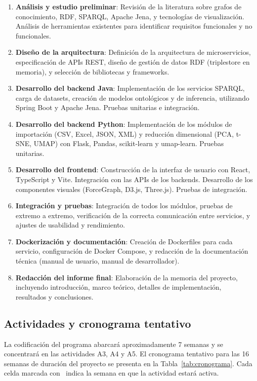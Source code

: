 \documentclass{article}
\begin{document}
\begin{enumerate}[leftmargin=*]
    \item \textbf{Análisis y estudio preliminar}: Revisión de la literatura sobre grafos de conocimiento, RDF, SPARQL, Apache Jena, y tecnologías de visualización. Análisis de herramientas existentes para identificar requisitos funcionales y no funcionales.
    \item \textbf{Diseño de la arquitectura}: Definición de la arquitectura de microservicios, especificación de APIs REST, diseño de gestión de datos RDF (triplestore en memoria), y selección de bibliotecas y frameworks.
    \item \textbf{Desarrollo del backend Java}: Implementación de los servicios SPARQL, carga de datasets, creación de modelos ontológicos y de inferencia, utilizando Spring Boot y Apache Jena. Pruebas unitarias e integración.
    \item \textbf{Desarrollo del backend Python}: Implementación de los módulos de importación (CSV, Excel, JSON, XML) y reducción dimensional (PCA, t-SNE, UMAP) con Flask, Pandas, scikit-learn y umap-learn. Pruebas unitarias.
    \item \textbf{Desarrollo del frontend}: Construcción de la interfaz de usuario con React, TypeScript y Vite. Integración con las APIs de los backends. Desarrollo de los componentes visuales (ForceGraph, D3.js, Three.js). Pruebas de integración.
    \item \textbf{Integración y pruebas}: Integración de todos los módulos, pruebas de extremo a extremo, verificación de la correcta comunicación entre servicios, y ajustes de usabilidad y rendimiento.
    \item \textbf{Dockerización y documentación}: Creación de Dockerfiles para cada servicio, configuración de Docker Compose, y redacción de la documentación técnica (manual de usuario, manual de desarrollador).
    \item \textbf{Redacción del informe final}: Elaboración de la memoria del proyecto, incluyendo introducción, marco teórico, detalles de implementación, resultados y conclusiones.
\end{enumerate}

\subsection*{Actividades y cronograma tentativo}
La codificación del programa abarcará aproximadamente 7 semanas y se concentrará en las actividades A3, A4 y A5. El cronograma tentativo para las 16 semanas de duración del proyecto se presenta en la Tabla~\ref{tab:cronograma}. Cada celda marcada con \textbullet\ indica la semana en que la actividad estará activa.
\end{document}
